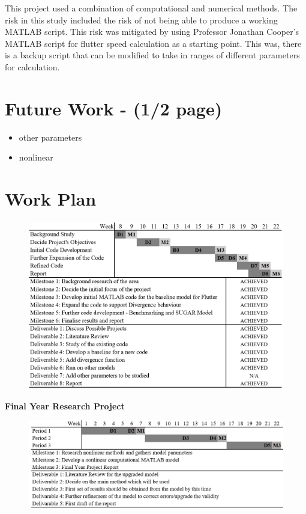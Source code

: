 \documentclass[11pt]{article}
\begin{document}
This project used a combination of computational and numerical methods. The risk in this study included the risk of not being able to produce a working MATLAB script. This risk was mitigated by using Professor Jonathan Cooper's MATLAB script \cite{Wright2015INTRODUCTIONLOADS} for flutter speed calculation as a starting point. This was, there is a backup script that can be modified to take in ranges of different parameters for calculation. 

\section{Future Work - (1/2 page)}
\begin{itemize}
    \item other parameters
    \item nonlinear
\end{itemize}

\section{Work Plan}
\begin{figure}[H]
    \centering
    \includegraphics[width = .9\textwidth]{figures/dandm.png}
\end{figure}

\textbf{Final Year Research Project}
\begin{figure}[H]
    \centering
    \includegraphics[width = .9\textwidth]{figures/fyp.png}
\end{figure}
\end{document}
